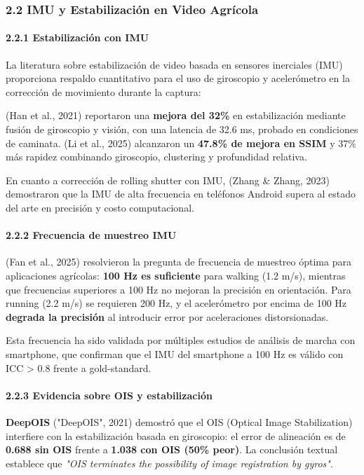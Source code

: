 \subsubsection{2.2 IMU y Estabilización en Video Agrícola}


\paragraph{2.2.1 Estabilización con IMU}


La literatura sobre estabilización de video basada en sensores inerciales (IMU) proporciona respaldo cuantitativo para el uso de giroscopio y acelerómetro en la corrección de movimiento durante la captura:


(Han et al., 2021) reportaron una \textbf{mejora del 32\%} en estabilización mediante fusión de giroscopio y visión, con una latencia de 32.6 ms, probado en condiciones de caminata. (Li et al., 2025) alcanzaron un \textbf{47.8\% de mejora en SSIM} y 37\% más rapidez combinando giroscopio, clustering y profundidad relativa.


En cuanto a corrección de rolling shutter con IMU, (Zhang \& Zhang, 2023) demostraron que la IMU de alta frecuencia en teléfonos Android supera al estado del arte en precisión y costo computacional.


\paragraph{2.2.2 Frecuencia de muestreo IMU}


(Fan et al., 2025) resolvieron la pregunta de frecuencia de muestreo óptima para aplicaciones agrícolas: \textbf{100 Hz es suficiente} para walking (1.2 m/s), mientras que frecuencias superiores a 100 Hz no mejoran la precisión en orientación. Para running (2.2 m/s) se requieren 200 Hz, y el acelerómetro por encima de 100 Hz \textbf{degrada la precisión} al introducir error por aceleraciones distorsionadas.


Esta frecuencia ha sido validada por múltiples estudios de análisis de marcha con smartphone, que confirman que el IMU del smartphone a 100 Hz es válido con ICC > 0.8 frente a gold-standard.


\paragraph{2.2.3 Evidencia sobre OIS y estabilización}


\textbf{DeepOIS} ("DeepOIS", 2021) demostró que el OIS (Optical Image Stabilization) interfiere con la estabilización basada en giroscopio: el error de alineación es de \textbf{0.688 sin OIS} frente a \textbf{1.038 con OIS (50\% peor)}. La conclusión textual establece que \textit{"OIS terminates the possibility of image registration by gyros"}.


